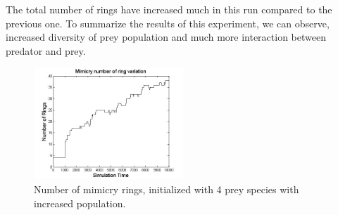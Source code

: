 \documentclass[letterpaper]{article}
\numberwithin{equation}{section}
\begin{document}
The total number of rings have increased much in this run compared to the previous one. To summarize the results of this experiment, we can observe, increased diversity of prey population and much more interaction between predator and prey.

\begin{figure}[H]
	\centering
	\includegraphics[width=0.5\textwidth]{../tex/images/ringSize10k-4MorePrey}
	\caption[Number of mimicry rings (4 prey species, increased population)]{Number of mimicry rings, initialized with 4 prey species with increased population.}
	\label{fig:ringSize10k-4MorePrey}
\end{figure}
\end{document}
